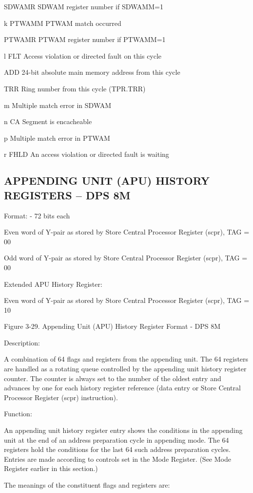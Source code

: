 SDWAMR SDWAM register number if SDWAMM=1

k PTWAMM PTWAM match occurred

PTWAMR PTWAM register number if PTWAMM=1

l FLT Access violation or directed fault on this cycle

ADD 24-bit absolute main memory address from this cycle

TRR Ring number from this cycle (TPR.TRR)

m Multiple match error in SDWAM

n CA Segment is encacheable

p Multiple match error in PTWAM

r FHLD An access violation or directed fault is waiting

\subsection{APPENDING UNIT (APU) HISTORY REGISTERS -- DPS 8M}

Format: - 72 bits each

Even word of Y-pair as stored by Store Central Processor Register (scpr), TAG = 00

Odd word of Y-pair as stored by Store Central Processor Register (scpr), TAG = 00

Extended APU History Register:

Even word of Y-pair as stored by Store Central Processor Register (scpr), TAG = 10

Figure 3-29. Appending Unit (APU) History Register Format - DPS 8M

Description:

A combination of 64 flags and registers from the appending unit. The 64
registers are handled as a rotating queue controlled by the appending unit
history register counter. The counter is always set to the number of the oldest
entry and advances by one for each history register reference (data entry or
Store Central Processor Register (scpr) instruction).

Function:

An appending unit history register entry shows the conditions in the appending
unit at the end of an address preparation cycle in appending mode. The 64
registers hold the conditions for the last 64 such address preparation cycles.
Entries are made according to controls set in the Mode Register. (See Mode
Register earlier in this section.)

The meanings of the constituent flags and registers are:

